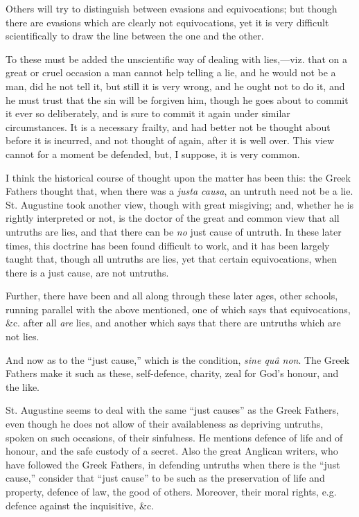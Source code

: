 Others will try to distinguish between evasions and equivocations;
but though there are evasions which are
clearly not equivocations, yet it is very difficult
scientifically to draw the line between the one and the other.

To these must be added the unscientific way of dealing with lies,—viz. that on a great or cruel occasion a man cannot help telling a lie,
and he would not be a man, did he not tell it, but still it is very wrong, and he ought not to do it, and he must trust that the
sin will be forgiven him, though he goes about to commit it ever so
deliberately, and is sure to commit it again under similar
circumstances. It is a necessary frailty, and had better not
be thought about before it is incurred, and not thought of again, after it is
well over. This view cannot for a moment be defended, but, I
suppose, it is very common.

I think the historical course of thought upon the matter
has been this: the Greek Fathers thought that, when there was a \emph{justa
causa}, an untruth need not be a lie. St. Augustine took another
view, though with great misgiving; and, whether he is rightly
interpreted or not, is the doctor of the great and common view that all
untruths are lies, and that there can be \emph{no} just cause of
untruth. In these later times, this doctrine has been found difficult to
work, and it has been largely taught that, though all untruths are lies,
yet that certain equivocations, when there is a just cause, are not
untruths.

Further, there have been and all along through these later ages,
other schools, running parallel with the above mentioned, one of which
says that equivocations, \&c. after all \emph{are} lies, and another
which says that there are untruths which are not lies.

And now as to the ``just cause,'' which is the condition, \emph{sine
quâ non}. The Greek Fathers make it such as these, self-defence,
charity, zeal for God's honour, and the like.

St. Augustine seems to deal with the same ``just causes'' as
the Greek Fathers, even though he does not allow of their availableness
as depriving untruths, spoken on such occasions, of their
sinfulness. He mentions defence of life and of honour, and the safe
custody of a secret. Also the great Anglican writers, who have followed the
Greek Fathers, in defending untruths when there is the ``just
cause,'' consider that ``just cause'' to be
such as the preservation of life and property, defence of law, the good
of others. Moreover, their moral rights, e.g. defence against the
inquisitive, \&c.

